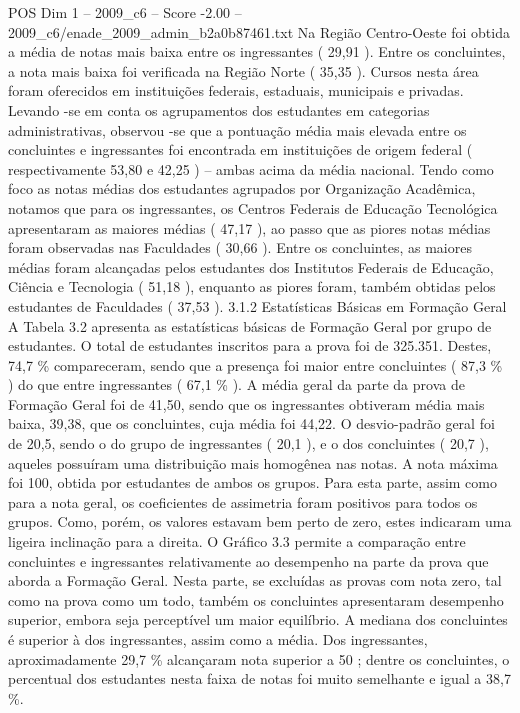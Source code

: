 \begin{textsample}{POS Dim 1 – 2009\_c6 – Score -2.00 – 2009\_c6/enade\_2009\_admin\_b2a0b87461.txt}
Na Região Centro-Oeste foi obtida a média de notas mais baixa entre os ingressantes ( 29,91 ).
Entre os concluintes, a nota mais baixa foi verificada na Região Norte ( 35,35 ).
Cursos nesta área foram oferecidos em instituições federais, estaduais, municipais e privadas.
Levando -se em conta os agrupamentos dos estudantes em categorias administrativas, observou -se que a pontuação média mais elevada entre os concluintes e ingressantes foi encontrada em instituições de origem federal ( respectivamente 53,80 e 42,25 ) – ambas acima da média nacional.
Tendo como foco as notas médias dos estudantes agrupados por Organização Acadêmica, notamos que para os ingressantes, os Centros Federais de Educação Tecnológica apresentaram as maiores médias ( 47,17 ), ao passo que as piores notas médias foram observadas nas Faculdades ( 30,66 ).
Entre os concluintes, as maiores médias foram alcançadas pelos estudantes dos Institutos Federais de Educação, Ciência e Tecnologia ( 51,18 ), enquanto as piores foram, também obtidas pelos estudantes de Faculdades ( 37,53 ). 3.1.2 Estatísticas Básicas em Formação Geral A Tabela 3.2 apresenta as estatísticas básicas de Formação Geral por grupo de estudantes.
O total de estudantes inscritos para a prova foi de 325.351.
Destes, 74,7 \% compareceram, sendo que a presença foi maior entre concluintes ( 87,3 \% ) do que entre ingressantes ( 67,1 \% ).
A média geral da parte da prova de Formação Geral foi de 41,50, sendo que os ingressantes obtiveram média mais baixa, 39,38, que os concluintes, cuja média foi 44,22.
O desvio-padrão geral foi de 20,5, sendo o do grupo de ingressantes ( 20,1 ), e o dos concluintes ( 20,7 ), aqueles possuíram uma distribuição mais homogênea nas notas.
A nota máxima foi 100, obtida por estudantes de ambos os grupos.
Para esta parte, assim como para a nota geral, os coeficientes de assimetria foram positivos para todos os grupos.
Como, porém, os valores estavam bem perto de zero, estes indicaram uma ligeira inclinação para a direita.
O Gráfico 3.3 permite a comparação entre concluintes e ingressantes relativamente ao desempenho na parte da prova que aborda a Formação Geral.
Nesta parte, se excluídas as provas com nota zero, tal como na prova como um todo, também os concluintes apresentaram desempenho superior, embora seja perceptível um maior equilíbrio.
A mediana dos concluintes é superior à dos ingressantes, assim como a média.
Dos ingressantes, aproximadamente 29,7 \% alcançaram nota superior a 50 ; dentre os concluintes, o percentual dos estudantes nesta faixa de notas foi muito semelhante e igual a 38,7 \%.

\end{textsample}
